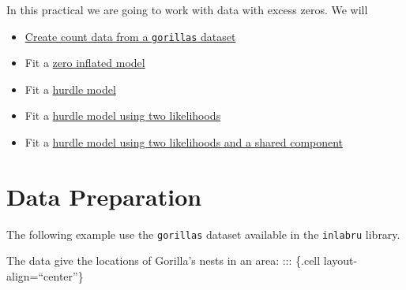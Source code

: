 \documentclass[
  letterpaper,
  DIV=11,
  numbers=noendperiod]{scrartcl}
\newenvironment{Shaded}{\begin{snugshade}}{\end{snugshade}}
\newcommand{\AttributeTok}[1]{\textcolor[rgb]{0.40,0.45,0.13}{#1}}
\newcommand{\DecValTok}[1]{\textcolor[rgb]{0.68,0.00,0.00}{#1}}
\newcommand{\FunctionTok}[1]{\textcolor[rgb]{0.28,0.35,0.67}{#1}}
\newcommand{\NormalTok}[1]{\textcolor[rgb]{0.00,0.23,0.31}{#1}}
\newcommand{\OtherTok}[1]{\textcolor[rgb]{0.00,0.23,0.31}{#1}}
\newcommand{\SpecialCharTok}[1]{\textcolor[rgb]{0.37,0.37,0.37}{#1}}
\begin{document}
In this practical we are going to work with data with excess zeros. We
will

\begin{itemize}
\item
  \hyperref[sec-prep]{Create count data from a \texttt{gorillas}
  dataset}
\item
  Fit a \hyperref[sec-zip]{zero inflated model}
\item
  Fit a \hyperref[sec-zap]{hurdle model}
\item
  Fit a \hyperref[sec-two-lik]{hurdle model using two likelihoods}
\item
  Fit a \hyperref[sec-two-lik-share]{hurdle model using two likelihoods
  and a shared component}
\end{itemize}

\section{Data Preparation}\label{sec-prep}

The following example use the \texttt{gorillas} dataset available in the
\texttt{inlabru} library.

The data give the locations of Gorilla's nests in an area: ::: \{.cell
layout-align=``center''\}

\begin{Shaded}
\end{Shaded}
\end{document}
